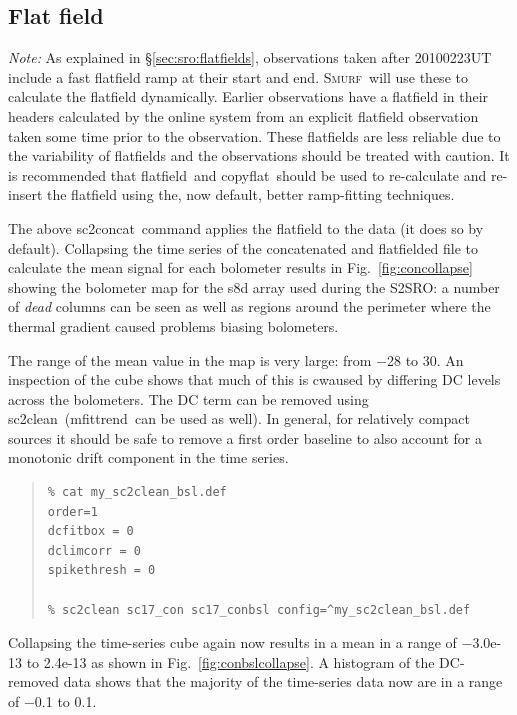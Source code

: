 \documentclass[twoside,11pt]{article}
\newcommand{\xref}[3]{#1}
\newcommand{\xlabel}[1]{}
\renewcommand{\_}{\texttt{\symbol{95}}}
\newenvironment{myquote}{\begin{quote}\begin{small}}{\end{small}\end{quote}}
\newcommand{\smurf}{\xref{\textsc{Smurf}}{sun258}{}}
\newcommand{\task}[1]{\textsf{#1}}
\newcommand{\copyflat}{\xref{\task{copyflat}}{sun258}{COPYFLAT}}
\newcommand{\concat}{\xref{\task{sc2concat}}{sun258}{SC2CONCAT}}
\newcommand{\clean}{\xref{\task{sc2clean}}{sun258}{SC2CLEAN}}
\newcommand{\flatfield}{\xref{\task{flatfield}}{sun258}{FLATFIELD}}
\newcommand{\mfittrend}{\xref{\task{mfittrend}}{sun95}{MFITTREND}}
\begin{document}
\subsection{\xlabel{flatfield2}Flat field}
\label{sec:flatfield2}

\textsl{Note:} As explained in \S\ref{sec:sro:flatfields}, observations
taken after 20100223UT include a fast flatfield ramp at their start
and end. \smurf\ will use these to calculate the flatfield
dynamically. Earlier observations have a flatfield in their headers
calculated by the online system from an explicit flatfield observation
taken some time prior to the observation. These flatfields are less
reliable due to the variability of flatfields and the observations
should be treated with caution. It is recommended that \flatfield\ and
\copyflat\ should be used to re-calculate and re-insert the flatfield
using the, now default, better ramp-fitting techniques.

The above \concat\  command applies the flatfield to the data (it
does so by default). Collapsing the time series of the concatenated
and flatfielded file to calculate the mean signal for each bolometer
results in Fig.~\ref{fig:concollapse} showing the bolometer map for
the s8d array used during the S2SRO: a number of \textsl{dead} columns
can be seen as well as regions around the perimeter where the thermal
gradient caused problems biasing bolometers.

The range of the mean value in the map is very large: from $-$28 to
30. An inspection of the cube shows that much of this is cwaused by
differing DC levels across the bolometers. The DC term can be removed
using \clean\  (\mfittrend\ can be used as well). In general, for
relatively compact sources it should be safe to remove a first order
baseline to also account for a monotonic drift component in the time
series.

\begin{myquote}
\begin{verbatim}
% cat my_sc2clean_bsl.def
order=1
dcfitbox = 0
dclimcorr = 0
spikethresh = 0

% sc2clean sc17_con sc17_conbsl config=^my_sc2clean_bsl.def
\end{verbatim}
\end{myquote}


Collapsing the time-series cube again now results in a mean in a range
of $-$3.0e-13 to 2.4e-13 as shown in Fig.~\ref{fig:conbslcollapse}. A
histogram of the DC-removed data shows that the majority of the
time-series data now are in a range of $-$0.1 to 0.1.
\end{document}
